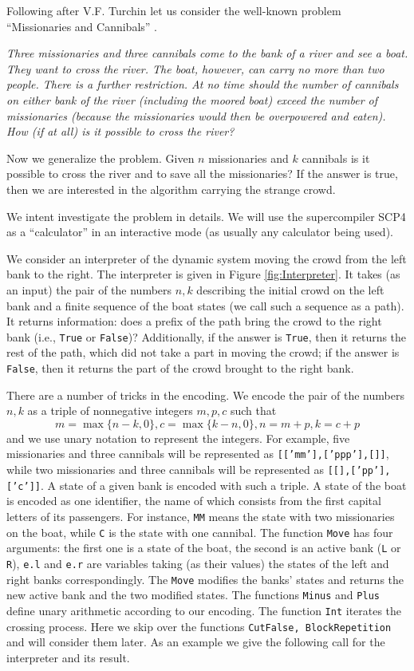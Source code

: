 \documentclass[preprint]{sigplanconf}
\begin{document}
Following after V.F. Turchin let us consider the well-known problem ``Missionaries and Cannibals'' \cite{Turchin:Refal5}. 

\emph{Three missionaries and three cannibals come to the bank of a river and see a boat. They want to cross the river. The boat, however, can carry no more than two people. There is a further restriction. At no time should the number of cannibals on either bank of the river (including the moored boat) exceed the number of missionaries (because the missionaries would then be overpowered and eaten). How (if at all) is it possible to cross the river?}

Now we generalize the problem. Given $n$ missionaries and $k$ cannibals is it possible to cross the river and to save all the missionaries? If the answer is true, then we are interested in the algorithm carrying the strange crowd.

We intent investigate the problem in details. We will use the supercompiler SCP4 as a ``calculator'' in
an interactive mode (as usually any calculator being used). 

We consider an interpreter of the dynamic system moving the crowd from the left bank to the right. 
The interpreter is given in Figure \ref{fig:Interpreter}. 
It takes (as an input) the pair of the numbers $n, k$ describing the initial crowd on the left bank and a finite sequence of the boat states (we call such a sequence as a path). It returns information: does a prefix of the path bring the crowd to the right bank (i.e., \texttt{True} or \texttt{False})? Additionally, if the answer is \texttt{True}, then it returns the rest of the path, which did not take a part in moving the crowd; if the answer is \texttt{False}, then it returns the part of the crowd brought to the right bank.

There are a number of tricks in the encoding. We encode the pair of the numbers $n, k$ as a triple of nonnegative integers $m,p,c$ such that 
$$m = \max\{n-k,0\}, c = \max\{k-n,0\}, n = m + p, k = c + p$$ 
and we use unary notation to represent the integers. For example, five missionaries and three cannibals will be represented as \texttt{[['mm'],['ppp'],[]]}, while two missionaries and three cannibals will be represented as \texttt{[[],['pp'],['c']]}. A state of a given bank is encoded with such a triple. A state of the boat is encoded as one identifier, the name of which consists from the first capital letters of its passengers. For instance, \texttt{MM} means the state with two missionaries on the boat, while \texttt{C} is the state with one cannibal. The function \texttt{Move} has four arguments: the first one is a state of the boat, the second is an active bank (\texttt{L} or \texttt{R}), \texttt{e.l} and \texttt{e.r} are variables taking (as their values) the states of the left and right banks correspondingly. The \texttt{Move} modifies the banks' states and returns the new active bank and the two modified states. The functions \texttt{Minus} and \texttt{Plus} define unary arithmetic according to our encoding. The function \texttt{Int} iterates the crossing process. Here we skip over the functions \texttt{CutFalse, BlockRepetition} and will consider them later. As an example we give the following call for the interpreter and its result.
\end{document}
